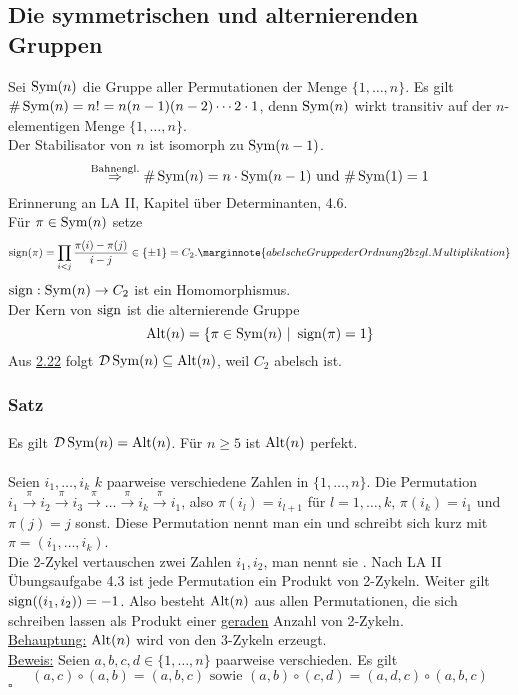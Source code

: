\subsection{Die symmetrischen und alternierenden Gruppen}
\label{sub:sym_alt_gruppen}
Sei $\operatorname{Sym}(n)$ die Gruppe aller Permutationen der Menge $\{1,\dots,n\}$. 
Es gilt $\#\operatorname{Sym}(n)=n!=n(n-1)(n-2)\cdots 2 \cdot 1$, denn $\operatorname{Sym}(n)$ wirkt transitiv auf der $n$-elementigen Menge $\{1,\dots,n\}$.\\
Der Stabilisator von $n$ ist isomorph zu $\operatorname{Sym}(n-1)$.
\[
\stackrel{\text{Bahnengl.}}{\Rightarrow} \#\operatorname{Sym}(n)=n\cdot \operatorname{Sym}(n-1)\text{ und }\#\operatorname{Sym}(1)=1
\]
Erinnerung an LA II, Kapitel über Determinanten, 4.6.\\
Für $\pi\in \operatorname{Sym}(n)$ setze 
\[
\sign(\pi)=\prod\limits_{i<j}\frac{\pi(i)-\pi(j)}{i-j}\in \{\pm 1\}=C_2.\marginnote{abelsche Gruppe der Ordnung 2 bzgl. Multiplikation}
\] 
$\operatorname{sign}:\operatorname{Sym}(n)\to C_2$ ist ein Homomorphismus.\\
Der Kern von $\operatorname{sign}$ ist die alternierende Gruppe 
\[
\operatorname{Alt}(n)=\{\pi\in\operatorname{Sym}(n)~|~\operatorname{sign}(\pi)=1\}
\]
Aus \hyperref[sub:komutatoren]{2.22} folgt $\mathcal{D}\operatorname{Sym}(n)\subseteq \operatorname{Alt}(n)$, weil $C_2$ abelsch ist.

\subsubsection*{Satz}
Es gilt $\mathcal{D}\operatorname{Sym}(n)=\operatorname{Alt}(n)$. Für $n\ge 5$ ist $\operatorname{Alt}(n)$ perfekt.\\

\\
Seien $i_1,\dots,i_k$ $k$ paarweise verschiedene Zahlen in $\{1,\dots,n\}$.
Die Permutation $i_1\stackrel{\pi}{\to} i_2\stackrel{\pi}{\to} i_3\stackrel{\pi}{\to}\dots\stackrel{\pi}{\to} i_k\stackrel{\pi}{\to} i_1$, also $\pi(i_l)=i_{l+1}$ für $l=1,\dots,k$, $\pi(i_k)=i_1$ und $\pi(j)=j$ sonst. 
Diese Permutation nennt man ein  und schreibt sich kurz mit $\pi=(i_1,\dots,i_k)$.\\
Die 2-Zykel vertauschen zwei Zahlen $i_1,i_2$, man nennt sie . 
Nach LA II Übungsaufgabe 4.3 ist jede Permutation ein Produkt von 2-Zykeln. 
Weiter gilt $\operatorname{sign}((i_1,i_2))=-1$. 
Also besteht $\operatorname{Alt}(n)$ aus allen Permutationen, die sich schreiben lassen als Produkt einer \uline{geraden} Anzahl von 2-Zykeln.\\

\uline{Behauptung:} $\operatorname{Alt}(n)$ wird von den 3-Zykeln erzeugt.\\
\uline{Beweis:} Seien $a,b,c,d\in \{1,\dots,n\}$ paarweise verschieden. 
Es gilt
\[
(a,c)\circ(a,b)=(a,b,c) \text{ sowie } (a,b)\circ (c,d)=(a,d,c)\circ (a,b,c)
\] 
\hfill $\square$

